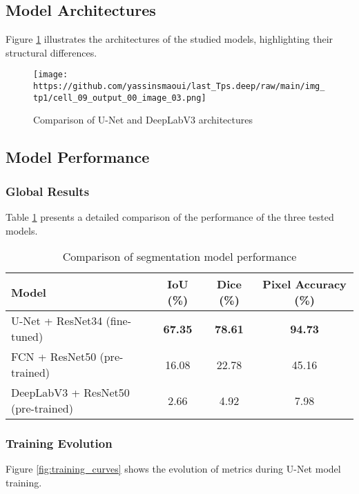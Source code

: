 \documentclass[12pt,a4paper]{article}
\begin{document}
\subsection{Model Architectures}

Figure \ref{fig:model_architectures} illustrates the architectures of the studied models, highlighting their structural differences.

\begin{figure}[H]
    \centering
    \texttt{[image: https://github.com/yassinsmaoui/last\_Tps.deep/raw/main/img\_tp1/cell\_09\_output\_00\_image\_03.png]}
    \caption{Comparison of U-Net and DeepLabV3 architectures}
    \label{fig:model_architectures}
\end{figure}

\subsection{Model Performance}

\subsubsection{Global Results}

Table \ref{tab:model_comparison} presents a detailed comparison of the performance of the three tested models.

\begin{table}[H]
\centering
\caption{Comparison of segmentation model performance}
\label{tab:model_comparison}
\begin{tabular}{@{}lccc@{}}
\toprule
\textbf{Model} & \textbf{IoU (\%)} & \textbf{Dice (\%)} & \textbf{Pixel Accuracy (\%)} \\
\midrule
U-Net + ResNet34 (fine-tuned) & \textbf{67.35} & \textbf{78.61} & \textbf{94.73} \\
FCN + ResNet50 (pre-trained) & 16.08 & 22.78 & 45.16 \\
DeepLabV3 + ResNet50 (pre-trained) & 2.66 & 4.92 & 7.98 \\
\bottomrule
\end{tabular}
\end{table}

\subsubsection{Training Evolution}

Figure \ref{fig:training_curves} shows the evolution of metrics during U-Net model training.
\end{document}
